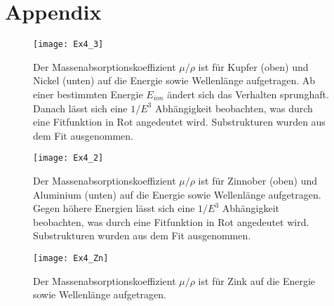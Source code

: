 \section{Appendix}\label{sec:appendix}

\begin{figure}[H]
	\centering
	\texttt{[image: Ex4\_3]}
	\caption{Der Massenabsorptionskoeffizient \( \mu/\rho \) ist für Kupfer (oben) und Nickel (unten) auf die Energie sowie Wellenlänge aufgetragen. Ab einer bestimmten Energie \( E_{ion} \) ändert sich das Verhalten sprunghaft. Danach lässt sich eine \( 1/E^3 \) Abhängigkeit beobachten, was durch eine Fitfunktion in Rot angedeutet wird. Substrukturen wurden aus dem Fit ausgenommen.}
	\label{fig:plot3}
\end{figure}

\begin{figure}[H]
	\centering
	\texttt{[image: Ex4\_2]}
	\caption{Der Massenabsorptionskoeffizient \( \mu/\rho \) ist für Zinnober (oben) und Aluminium (unten) auf die Energie sowie Wellenlänge aufgetragen. Gegen höhere Energien lässt sich eine \( 1/E^3 \) Abhängigkeit beobachten, was durch eine Fitfunktion in Rot angedeutet wird. Substrukturen wurden aus dem Fit ausgenommen.}
	\label{fig:plot3}
\end{figure}

\begin{figure}[H]
	\centering
	\texttt{[image: Ex4\_Zn]}
	\caption{Der Massenabsorptionskoeffizient \( \mu/\rho \) ist für Zink auf die Energie sowie Wellenlänge aufgetragen.}
	\label{fig:plot3}
\end{figure}